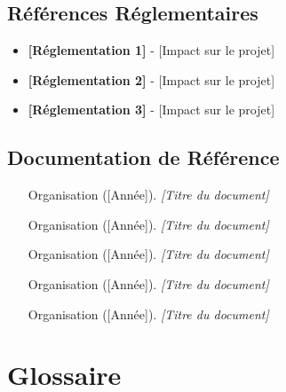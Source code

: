 \subsection{Références Réglementaires}

\begin{itemize}
\item \textbf{[Réglementation 1]} - [Impact sur le projet]
\item \textbf{[Réglementation 2]} - [Impact sur le projet]
\item \textbf{[Réglementation 3]} - [Impact sur le projet]
\end{itemize}

\subsection{Documentation de Référence}

\begin{enumerate}
\item [Organisation] ([Année]). \textit{[Titre du document]}
\item [Organisation] ([Année]). \textit{[Titre du document]}
\item [Organisation] ([Année]). \textit{[Titre du document]}
\item [Organisation] ([Année]). \textit{[Titre du document]}
\item [Organisation] ([Année]). \textit{[Titre du document]}
\end{enumerate}

\section{Glossaire}
\label{app:glossary}

